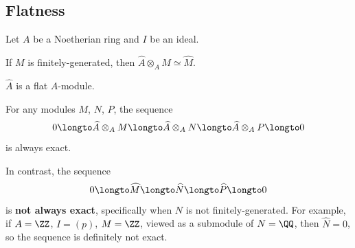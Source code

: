 \subsection{Flatness}
\begin{theorem}
    Let $A$ be a Noetherian ring and $I$ be an ideal.
    \begin{alphenum}
    \item If $M$ is finitely-generated, then 
    $\widehat A\otimes_A M \simeq \widehat M$.
    \item $\widehat A$ is a flat $A$-module.
    \end{alphenum}
\end{theorem}
\begin{warn}
    For any modules $M$, $N$, $P$, the sequence
    $$0\longto \widehat A\otimes_A M 
    \longto \widehat A \otimes_A N
    \longto \widehat A\otimes_A P \longto 0$$
    is always exact.

    In contrast, the sequence
    $$0\longto \widehat M 
    \longto \widehat N
    \longto \widehat P\longto 0$$
    is \textbf{not always exact}, specifically when 
    $N$ is not finitely-generated.
    For example, if $A=\ZZ$, $I=(p)$, 
    $M=\ZZ$, viewed as a submodule
    of $N=\QQ$, then $\widehat N=0$, so the sequence
    is definitely not exact.
\end{warn}
